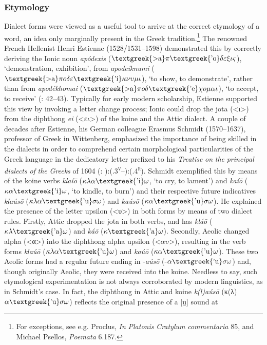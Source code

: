 \subsubsection{Etymology}
\hypertarget{Toc19704821}{}
Dialect forms were viewed as a useful tool to arrive at the correct etymology of a word, an idea only marginally present in the Greek tradition.\footnote{For exceptions, see e.g. Proclus, \textit{In} \textit{Platonis} \textit{Cratylum} \textit{commentaria} 85, and Michael Psellos, \textit{Poemata} 6.187.} The renowned French Hellenist Henri Estienne (1528/1531–1598) demonstrated this by correctly deriving the Ionic noun \textit{apódexis} ($\text{\textgreek{>a}}\pi \text{\textgreek{'o}}\delta \varepsilon \xi \iota \varsigma $), ‘demonstration, exhibition’, from \textit{apodeíknumi} ($\text{\textgreek{>a}}\pi o\delta \varepsilon \text{\textgreek{'i}}\kappa \nu \upsilon \mu \iota $), ‘to show, to demonstrate’, rather than from \textit{apodékhomai} ($\text{\textgreek{>a}}\pi o\delta \text{\textgreek{'e}}\chi o\mu \alpha \iota $), ‘to accept, to receive’ (\citealt{Estienne1581}: 42–43). Typically for early modern scholarship, Estienne supported this view by invoking a letter change process; Ionic could drop the jota (<ι>) from the diphthong \textit{ei} (<$\varepsilon \iota $>) of the koine and the Attic dialect. A couple of decades after Estienne, his German colleague Erasmus Schmidt (1570–1637), professor of Greek in Wittenberg, emphasized the importance of being skilled in the dialects in order to comprehend certain morphological particularities of the Greek language in the dedicatory letter prefixed to his \textit{Treatise} \textit{on} \textit{the} \textit{principal} \textit{dialects} \textit{of} \textit{the} \textit{Greeks} of 1604 (\citealt{Schmidt1604}: ):(.3\textsc{\textsuperscript{v}}–):(.4\textsc{\textsuperscript{r}}). Schmidt exemplified this by means of the koine verbs \textit{klaíō} ($\kappa \lambda \alpha \text{\textgreek{'i}}\omega $, ‘to cry, to lament’) and \textit{kaíō} ($\kappa \alpha \text{\textgreek{'i}}\omega $, ‘to kindle, to burn’) and their respective future indicatives \textit{klaúsō} ($\kappa \lambda \alpha \text{\textgreek{'u}}\sigma \omega $) and \textit{kaúsō} ($\kappa \alpha \text{\textgreek{'u}}\sigma \omega $). He explained the presence of the letter upsilon (<υ>) in both forms by means of two dialect rules. Firstly, Attic dropped the jota in both verbs, and has \textit{kláō} ($\kappa \lambda \text{\textgreek{'a}}\omega $) and \textit{káō} ($\kappa \text{\textgreek{'a}}\omega $). Secondly, Aeolic changed alpha (<α>) into the diphthong alpha upsilon (<$\alpha \upsilon $>), resulting in the verb forms \textit{klaúō} ($\kappa \lambda \alpha \text{\textgreek{'u}}\omega $) and \textit{kaúō} ($\kappa \alpha \text{\textgreek{'u}}\omega $). These two Aeolic forms had a regular future ending in -\textit{aúsō} (-$\alpha \text{\textgreek{'u}}\sigma \omega $) and, though originally Aeolic, they were received into the koine. Needless to say, such etymological experimentation is not always corroborated by modern linguistics, as in Schmidt’s case.\textstyleFootnoteSymbol{} In fact, the diphthong in Attic and koine \textit{k(l)aúsō} (κ(λ)$\alpha \text{\textgreek{'u}}\sigma \omega $) reflects the original presence of a [u̯] sound at 